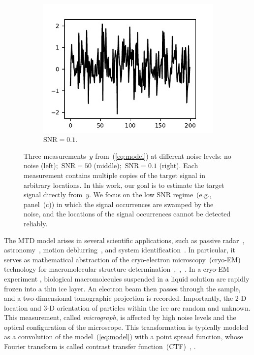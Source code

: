 \documentclass{article}
\begin{document}
\begin{figure}[!tb]
\begin{subfigure}[ht]{0.30\textwidth}
		\includegraphics[width=\columnwidth]{figures/y_SNR01.pdf}
		\caption{$\text{SNR} = 0.1$.}
	\end{subfigure}
	\caption{Three measurements~$y$ from~(\ref{eq:model}) at different noise levels: no noise (left);~\mbox{$\text{SNR} = 50$} (middle);~\mbox{$\text{SNR} = 0.1$} (right). Each measurement contains multiple copies of the target signal in arbitrary locations. In this work, our goal is to estimate the target signal directly from~$y$. We focus on the low SNR regime~(e.g., panel~(c)) in which the signal occurrences are swamped by the noise, and the locations of the signal occurrences cannot be detected reliably.}
\label{fig:measurements}
\end{figure}

The MTD model arises in several scientific applications, such as passive radar~\cite{gogineni2017passive}, astronomy~\cite{schulz1993multiframe}, motion deblurring~\cite{levin2006blind}, and system identification~\cite{abed1997blind}. In particular, it serves as mathematical abstraction of the cryo-electron microscopy~(\mbox{cryo-EM}) technology for macromolecular structure determination~\cite{henderson1995potential},~\cite{nogales2016development},~\cite{bai2015cryo}. In a \mbox{cryo-EM} experiment \cite{frank2006three}, biological macromolecules suspended in a liquid solution are rapidly frozen into a thin ice layer. An electron beam then passes through the sample, and a two-dimensional tomographic projection is recorded. Importantly, the \mbox{2-D} location and \mbox{3-D} orientation of particles within the ice are random and unknown. This measurement, called \textit{micrograph}, is affected by high noise levels and the optical configuration of the microscope. This transformation is typically modeled as a convolution of the model~(\ref{eq:model}) with a point spread function, whose Fourier transform is called contrast transfer function~(CTF)~\cite{heimowitz2020reducing}, \cite{erickson1971measurement}.
\end{document}

